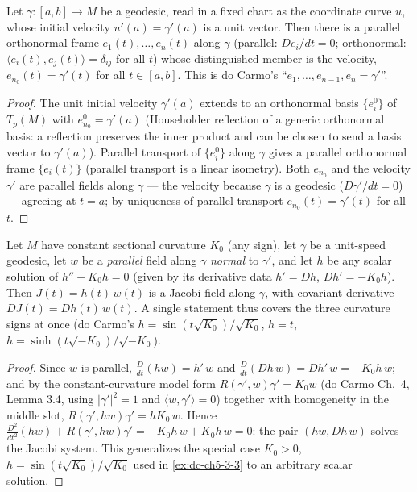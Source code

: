 \begin{lemma}
  \label{lem:dc-ch8-2-1-velocity-frame}
  \leanok
  Let $\gamma:[a,b]\to M$ be a geodesic, read in a fixed chart as the coordinate curve
  $u$, whose initial velocity $u'(a)=\gamma'(a)$ is a unit vector. Then there is a parallel
  orthonormal frame $e_1(t),\dots,e_n(t)$ along $\gamma$ (parallel: $De_i/dt=0$; orthonormal:
  $\langle e_i(t),e_j(t)\rangle=\delta_{ij}$ for all $t$) whose distinguished member is the
  velocity, $e_{n_0}(t)=\gamma'(t)$ for all $t\in[a,b]$. This is do Carmo's
  ``$e_1,\dots,e_{n-1},e_n=\gamma'$''.
\end{lemma}
\begin{proof}
  \leanok
  The unit initial velocity $\gamma'(a)$ extends to an orthonormal basis $\{e_i^0\}$ of
  $T_p(M)$ with $e_{n_0}^0=\gamma'(a)$ (Householder reflection of a generic orthonormal basis:
  a reflection preserves the inner product and can be chosen to send a basis vector to
  $\gamma'(a)$). Parallel transport of $\{e_i^0\}$ along $\gamma$ gives a parallel orthonormal
  frame $\{e_i(t)\}$ (parallel transport is a linear isometry). Both $e_{n_0}$ and the
  velocity $\gamma'$ are parallel fields along $\gamma$ --- the velocity because $\gamma$ is a
  geodesic ($D\gamma'/dt=0$) --- agreeing at $t=a$; by uniqueness of parallel transport
  $e_{n_0}(t)=\gamma'(t)$ for all $t$.
\end{proof}

\begin{lemma}
  \label{lem:dc-ch8-2-1-jacobi-const-solution}
  \leanok
  Let $M$ have constant sectional curvature $K_0$ (any sign), let $\gamma$ be a
  unit-speed geodesic, let $w$ be a \emph{parallel} field along $\gamma$ \emph{normal}
  to $\gamma'$, and let $h$ be any scalar solution of $h''+K_0 h=0$ (given by its
  derivative data $h'=Dh$, $Dh'=-K_0 h$). Then $J(t)=h(t)\,w(t)$ is a Jacobi field
  along $\gamma$, with covariant derivative $DJ(t)=Dh(t)\,w(t)$. A single statement thus
  covers the three curvature signs at once (do Carmo's
  $h=\sin(t\sqrt{K_0})/\sqrt{K_0}$, $h=t$, $h=\sinh(t\sqrt{-K_0})/\sqrt{-K_0}$).
\end{lemma}
\begin{proof}
  \leanok
  Since $w$ is parallel, $\tfrac{D}{dt}(h w)=h'\,w$ and
  $\tfrac{D}{dt}(Dh\,w)=Dh'\,w=-K_0 h\,w$; and by the constant-curvature model form
  $R(\gamma',w)\gamma'=K_0 w$ (do Carmo Ch.~4, Lemma 3.4, using $|\gamma'|^2=1$ and
  $\langle w,\gamma'\rangle=0$) together with homogeneity in the middle slot,
  $R(\gamma',h w)\gamma'=h K_0\,w$. Hence
  $\tfrac{D^2}{dt^2}(h w)+R(\gamma',h w)\gamma'=-K_0 h\,w+K_0 h\,w=0$: the pair
  $(h w, Dh\,w)$ solves the Jacobi system. This generalizes the special case
  $K_0>0$, $h=\sin(t\sqrt{K_0})/\sqrt{K_0}$ used in
  \cref{ex:dc-ch5-3-3} to an arbitrary scalar solution.
\end{proof}

